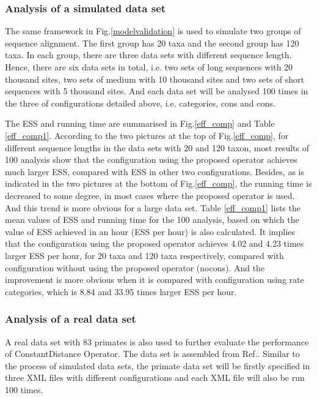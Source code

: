 \documentclass{bmcart}
\begin{document}
\subsubsection*{Analysis of a simulated data set}
The same framework in Fig.\ref{modelvalidation} is used to simulate two groups of sequence alignment. The first group has 20 taxa and the second group has 120 taxa. In each group, there are three data sets with different sequence length. Hence, there are six data sets in total, i.e. two sets of long sequences with 20 thousand sites, two sets of medium with 10 thousand sites and two sets of short sequences with 5 thousand sites. And each data set will be analysed 100 times in the three of configurations detailed above, i.e. categories, cons and cons. 

The ESS and running time are summarised in Fig.\ref{eff_comp} and Table \ref{eff_comp1}. According to the two pictures at the top of Fig.\ref{eff_comp}, for different sequence lengths in the data sets with 20 and 120 taxon, most results of 100 analysis show that the configuration using the proposed operator achieves much larger ESS, compared with ESS in other two configurations. Besides, as is indicated in the two pictures at the bottom of Fig.\ref{eff_comp}, the running time is decreased to some degree, in most cases where the proposed operator is used. And this trend is more obvious for a large data set. Table \ref{eff_comp1} lists the mean values of ESS and running time for the 100 analysis, based on which the value of ESS achieved in an hour (ESS per hour) is also calculated. It implies that the configuration using the proposed operator achieves 4.02 and 4.23 times larger ESS per hour, for 20 taxa and 120 taxa respectively, compared with configuration without using the proposed operator (nocons). And the improvement is more obvious when it is compared with configuration using rate categories, which is 8.84 and 33.95 times larger ESS per hour.
\subsubsection*{Analysis of a real data set}
A real data set with 83 primates is also used to further evaluate the performance of ConstantDistance Operator. The data set is assembled from Ref.\cite{finstermeier2013mitogenomic}. Similar to the process of simulated data sets, the primate data set will be firstly specified in three XML files with different configurations and each XML file will also be run 100 times. 
\end{document}
